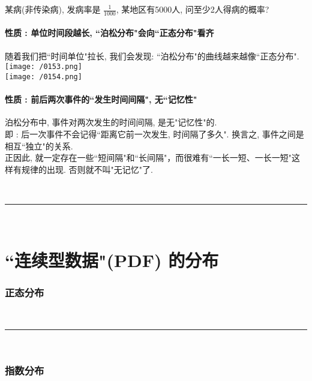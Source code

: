 \documentclass[UTF8]{ctexart}
\begin{document}
	
	
	
	\begin{myEnvSample}
		某病(非传染病), 发病率是 $\frac{1} {1000}$, 某地区有5000人, 问至少2人得病的概率? \\
		
	\end{myEnvSample}
	
	
	
	
	
	\subsection{性质 : 单位时间段越长, ``泊松分布"会向``正态分布"看齐 }
	
	随着我们把``时间单位"拉长, 我们会发现: ``泊松分布"的曲线越来越像``正态分布". \\
	
		\texttt{[image: /0153.png]} \\	
		\texttt{[image: /0154.png]} \\	
	
	
	
	\subsection{性质 : 前后两次事件的``发生时间间隔", 无``记忆性"}
	
	泊松分布中, 事件对两次发生的时间间隔, 是无"记忆性"的. \\
	即 : 后一次事件不会记得``距离它前一次发生, 时间隔了多久". 换言之, 事件之间是相互``独立"的关系. \\
	正因此, 就一定存在一些``短间隔"和``长间隔"，而很难有``一长一短、一长一短"这样有规律的出现. 否则就不叫"无记忆"了. 
	
	
	
	
	
	
	
	~\\
	\hrule
	~\\
	
	\part{``连续型数据"(PDF) 的分布}
	
	\section{正态分布}
	
	
	
	~\\
	\hrule
	~\\
	
	\section{指数分布}
	
	
	
	
	
\end{document}

